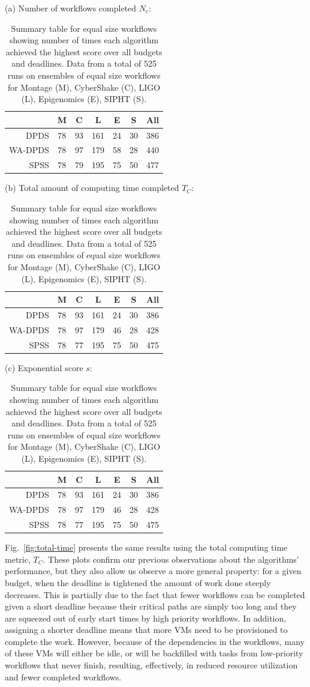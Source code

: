 \documentclass{sig-alternate}
\begin{document}
\begin{table}[tb]
\centering

(a) Number of workflows completed $N_c$:
\medskip
\begin{tabular}{r|cccccc}
 & M & C & L & E & S & All\tabularnewline
\hline
DPDS      &   78 &  93 & 161 &  24  & 30 & 386\tabularnewline
WA-DPDS   &    78  & 97 & 179  & 58  & 28 & 440\tabularnewline
SPSS     &    78  & 79 & 195 &  75 &  50 & 477\tabularnewline
\end{tabular}
\medskip

(b) Total amount of computing time completed $T_C$:
\medskip
\begin{tabular}{r|cccccc}
 & M & C & L & E & S & All\tabularnewline
\hline
DPDS      &   78 &  93 & 161 &  24 &  30 & 386\tabularnewline
WA-DPDS   &    78  & 97 & 179 &  46  & 28 & 428\tabularnewline
SPSS     &    78 &  77 & 195  & 75 &  50 & 475\tabularnewline
\end{tabular}
\medskip

(c) Exponential score $s$:
\medskip
\begin{tabular}{r|cccccc}
 & M & C & L & E & S & All\tabularnewline
\hline
DPDS      &   78  & 93 & 161 &  24 &  30 & 386\tabularnewline
WA-DPDS   &    78 &  97 & 179  & 46  & 28 & 428\tabularnewline
SPSS     &    78 &  77 & 195 &  75  & 50 & 475\tabularnewline
\end{tabular}
\medskip

\caption{Summary table for equal size workflows showing number of times each
algorithm achieved the highest score over all budgets and deadlines. Data from a total of 525 runs on 
ensembles of equal size workflows for Montage (M), CyberShake (C), LIGO (L), 
Epigenomics (E), SIPHT (S).
\label{tab:num-dags-equal}}
\end{table}

Fig.~\ref{fig:total-time} presents the same results using the total computing
time metric, $T_C$. These plots confirm our previous observations about the
algorithms' performance, but they also allow us observe a more general property:
for a given budget, when the deadline is tightened the amount of work done
steeply decreases. This is partially due to the fact that fewer workflows can be
completed given a short deadline because their critical paths are simply too long
and they are squeezed out of early start times by high priority workflows.
In addition, assigning a shorter deadline means that more VMs need to be
provisioned to complete the work. However, because of the dependencies in the 
workflows, many of these VMs will either be idle, or will be backfilled with 
tasks from low-priority workflows that never finish, resulting, effectively, 
in reduced resource utilization and fewer completed workflows.
\end{document}
